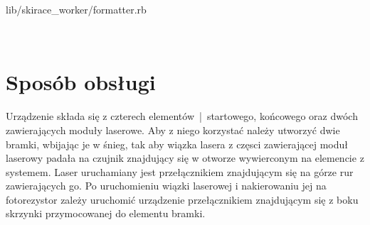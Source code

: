 \documentclass[11pt,a4paper, twoside]{article}
\begin{document}
\begin{listing}
\inputminted[linenos=true]{ruby}{./src/formatter.rb}
\caption{lib/skirace\_worker/formatter.rb}
$\label{formatter}$
\end{listing}
\section{Sposób obsługi}
Urządzenie składa się z czterech elementów~|~startowego, końcowego oraz dwóch zawierających moduły laserowe. Aby z niego korzystać należy utworzyć dwie bramki, wbijając je w śnieg, tak aby wiązka lasera z częsci zawierającej moduł laserowy padała na czujnik znajdujący się w otworze wywierconym na elemencie z systemem. Laser uruchamiany jest przełącznikiem znajdującym się na górze rur zawierających go. Po uruchomieniu wiązki laserowej i nakierowaniu jej na fotorezystor zależy uruchomić urządzenie przełącznikiem znajdującym się z boku skrzynki przymocowanej do elementu bramki.
\end{document}

